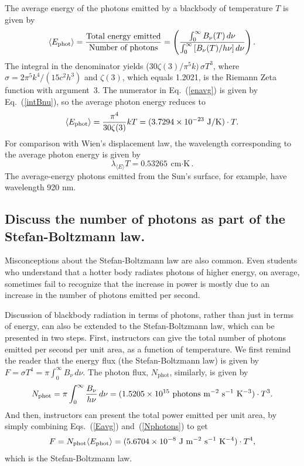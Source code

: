 \documentclass[12pt,aps,prb,preprint]{revtex4}   %
\begin{document}
The average energy of the photons emitted by a blackbody of temperature $T$ is given by
\begin{equation}
\label{enavg}
\langle E_{\textrm{phot}}\rangle = {\textrm{Total~energy~emitted}\over \textrm{Number~of~photons}} = \left( \int_0^\infty{B_\nu(T)\, d\nu} \over \int_0^\infty{[B_\nu(T)/{h\nu}]\, d\nu}\right).
\end{equation}
The integral in the denominator yields
($30 \zeta (3) /\pi^5 k)\, \sigma T^3$, where 
$\sigma = {2 \pi^5 k^4 /(15 c^2 h^3)}$ and $\zeta(3)$, which equals 1.2021, is the Riemann Zeta function with argument~3. The numerator in Eq.~(\ref{enavg}) is given by Eq.~(\ref{intBnu}), so 
the average photon energy reduces to
\begin{equation}
\label{Eavg}
\langle E_{\textrm{phot}}\rangle = {\pi^4 \over {30 \zeta (3)}} kT = (3.7294\times 10^{-23}~\textrm{J/K})\cdot T.
\end{equation}
For comparison with Wien's displacement law, the wavelength corresponding to the average photon energy is given by
\begin{equation}
\label{lambdaavg}
\lambda_{\langle E\rangle} T = 0.53265~{\textrm{cm}\cdot\textrm{K}}.
\end{equation}
The average-energy photons emitted from the Sun's surface, for example, have wavelength 920 nm.

\subsection{Discuss the number of photons as part of the Stefan-Boltzmann law.}

Misconceptions about the Stefan-Boltzmann law are also common.  Even students who understand that a hotter body radiates photons of higher energy, on average, sometimes fail to recognize that the increase in power is mostly due to an increase in the number of photons emitted per second. 

Discussion of blackbody radiation in terms of photons, rather than just in terms of energy, can also be extended to the Stefan-Boltzmann law, which can be presented in two steps.  First, instructors can give the total number of photons emitted per second per unit area, as a function of temperature.  
We first remind the reader that the energy flux (the Stefan-Boltzmann law) is given by 
$F = \sigma T^4 = \pi \int_0^\infty{B_\nu\, d\nu}$.  The photon flux, $N_{\textrm{phot}}$, similarly, is given by 
\begin{equation}
\label{Nphotons}
N_{{\textrm{phot}}} = \pi \int_0^\infty{{B_\nu \over h\nu}\, d\nu}=
(1.5205 \times 10^{15}~{\rm photons~m^{-2}~s^{-1}~K^{-3}})\cdot T^3 .
\end{equation}
And then, instructors can present the total power emitted per unit area, by simply combining Eqs.\ (\ref{Eavg}) and~(\ref{Nphotons}) to get
\begin{equation}
\label{SBphot}
F =  N_{\textrm{phot}} \langle E_{\textrm{phot}}\rangle = (5.6704 \times 10^{-8}~ {\rm J~m^{-2}~s^{-1}~K^{-4}})\cdot T^4,
\end{equation}
which is the Stefan-Boltzmann law.  
\end{document}
